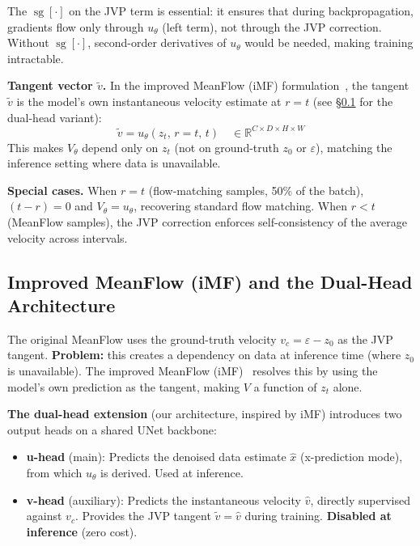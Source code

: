 \documentclass[11pt,a4paper]{article}
\DeclareMathOperator{\sg}{sg}        %
\begin{document}
\noindent
The $\sg[\cdot]$ on the JVP term is essential: it ensures that during
backpropagation, gradients flow only through $u_\theta$ (left term), not
through the JVP correction.  Without $\sg[\cdot]$, second-order derivatives of
$u_\theta$ would be needed, making training intractable.

\textbf{Tangent vector $\tilde{v}$.}  In the improved MeanFlow (iMF)
formulation~\cite{imf}, the tangent $\tilde{v}$ is the model's own
instantaneous velocity estimate at $r{=}t$ (see \S\ref{sec:vhead} for
the dual-head variant):
\begin{equation}
  \tilde{v} = u_\theta(z_t,\,r{=}t,\,t)
  \quad \in \mathbb{R}^{C \times D \times H \times W}
  \label{eq:tangent_imf}
\end{equation}
This makes $V_\theta$ depend only on $z_t$ (not on ground-truth $z_0$ or
$\varepsilon$), matching the inference setting where data is unavailable.

\textbf{Special cases.}  When $r = t$ (flow-matching samples, 50\% of the
batch), $(t-r) = 0$ and $V_\theta = u_\theta$, recovering standard flow
matching.  When $r < t$ (MeanFlow samples), the JVP correction enforces
self-consistency of the average velocity across intervals.

\subsection{Improved MeanFlow (iMF) and the Dual-Head Architecture}
\label{sec:vhead}

The original MeanFlow uses the ground-truth velocity
$v_c = \varepsilon - z_0$ as the JVP tangent.  \textbf{Problem:} this creates
a dependency on data at inference time (where $z_0$ is unavailable).  The
improved MeanFlow (iMF)~\cite{imf} resolves this by using the model's own
prediction as the tangent, making $V$ a function of $z_t$ alone.

\textbf{The dual-head extension} (our architecture, inspired by iMF) introduces
two output heads on a shared UNet backbone:
\begin{itemize}[nosep]
  \item \textbf{u-head} (main): Predicts the denoised data estimate $\hat{x}$
    (x-prediction mode), from which $u_\theta$ is derived.  Used at inference.
  \item \textbf{v-head} (auxiliary): Predicts the instantaneous velocity
    $\hat{v}$, directly supervised against $v_c$.  Provides the JVP tangent
    $\tilde{v} = \hat{v}$ during training.  \textbf{Disabled at inference}
    (zero cost).
\end{itemize}
\end{document}
